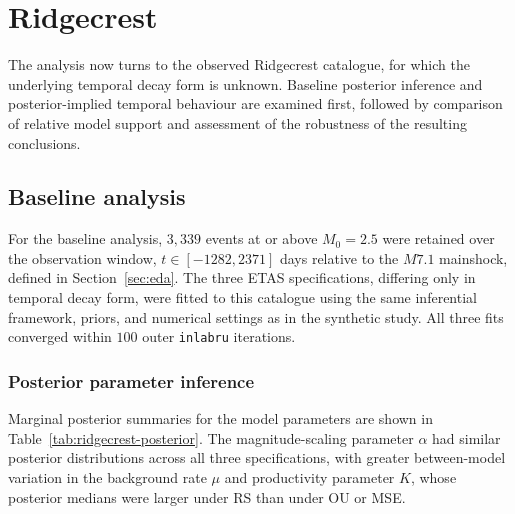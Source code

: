 \documentclass{statsmsc}
\begin{document}
\section{Ridgecrest}\label{sec:ridgecrest}
The analysis now turns to the observed Ridgecrest catalogue, for which the underlying temporal decay form is unknown. Baseline posterior inference and posterior-implied temporal behaviour are examined first, followed by comparison of relative model support and assessment of the robustness of the resulting conclusions.
\subsection{Baseline analysis}

For the baseline analysis, $3{,}339$ events at or above $M_0 = 2.5$ were retained over the observation window, $t\in[-1282,2371]$ days relative to the $M7.1$ mainshock, defined in Section~\ref{sec:eda}. The three ETAS specifications, differing only in temporal decay form, were fitted to this catalogue using the same inferential framework, priors, and numerical settings as in the synthetic study. All three fits converged within $100$ outer \texttt{inlabru} iterations.
\subsubsection{Posterior parameter inference}
Marginal posterior summaries for the model parameters are shown in Table~\ref{tab:ridgecrest-posterior}.  The magnitude-scaling parameter $\alpha$ had similar posterior distributions across all three specifications, with greater between-model variation in the background rate $\mu$ and productivity parameter $K$, whose posterior medians were larger under RS than under OU or MSE. 
\end{document}
